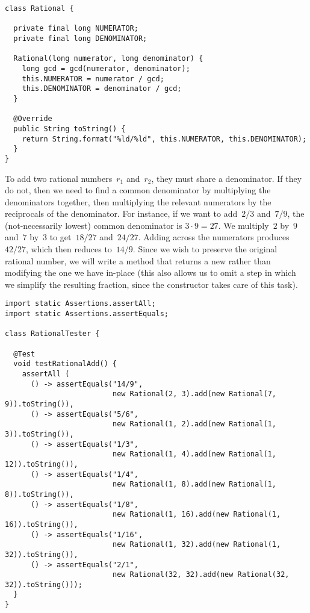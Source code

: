 \begin{lstlisting}[language=MyJava]
class Rational {
  
  private final long NUMERATOR;
  private final long DENOMINATOR;

  Rational(long numerator, long denominator) {
    long gcd = gcd(numerator, denominator);
    this.NUMERATOR = numerator / gcd;
    this.DENOMINATOR = denominator / gcd; 
  }

  @Override
  public String toString() {
    return String.format("%ld/%ld", this.NUMERATOR, this.DENOMINATOR);
  }
}
\end{lstlisting}

To add two rational numbers~$r_1$ and~$r_2$, they must share a denominator. 
If they do not, then we need to find a common denominator by multiplying the denominators together, then multiplying the relevant numerators by the reciprocals of the denominator. 
For instance, if we want to add~$2/3$ and~$7/9$, the (not-necessarily lowest) common denominator is $3\cdot{9} = 27$. 
We multiply~$2$ by~$9$ and~$7$ by~$3$ to get~$18/27$ and~$24/27$. 
Adding across the numerators produces~$42/27$, which then reduces to~$14/9$. 
Since we wish to preserve the original rational number, we will write a method that returns a new  rather than modifying the one we have in-place (this also allows us to omit a step in which we simplify the resulting fraction, since the constructor takes care of this task).

\begin{lstlisting}[language=MyJava]
import static Assertions.assertAll;
import static Assertions.assertEquals;

class RationalTester {

  @Test
  void testRationalAdd() {
    assertAll (
      () -> assertEquals("14/9", 
                         new Rational(2, 3).add(new Rational(7, 9)).toString()),
      () -> assertEquals("5/6", 
                         new Rational(1, 2).add(new Rational(1, 3)).toString()),
      () -> assertEquals("1/3", 
                         new Rational(1, 4).add(new Rational(1, 12)).toString()),
      () -> assertEquals("1/4", 
                         new Rational(1, 8).add(new Rational(1, 8)).toString()),
      () -> assertEquals("1/8", 
                         new Rational(1, 16).add(new Rational(1, 16)).toString()),
      () -> assertEquals("1/16", 
                         new Rational(1, 32).add(new Rational(1, 32)).toString()),
      () -> assertEquals("2/1", 
                         new Rational(32, 32).add(new Rational(32, 32)).toString()));
  }
}
\end{lstlisting}

